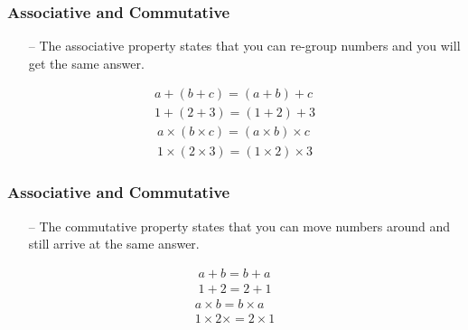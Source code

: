 \begin{frame}[c]{ }
	\frametitle{Associative and Commutative }
	\begin{itemize}  [<+->]
	
	\item [--] The associative property states that you can re-group numbers and you will get the same answer.
	
	
\end{itemize}

\begin{gather*}	
a + (b + c) =  (a + b) + c \\
1 + (2 + 3) = (1 + 2) + 3
\end{gather*}
\begin{gather*}
a \times (b \times c) =  (a \times b) \times c \\
1 \times (2 \times 3) =  (1 \times 2) \times 3
\end{gather*}

\end{frame}
\begin{frame}[c]{ }
	\frametitle{Associative and Commutative }
	\begin{itemize}  [<+->]		
		\item [--] The commutative property states that you can move numbers around and still arrive at the same answer.	
	\end{itemize}


\begin{gather*}	
	a + b =  b + a \\
	1 + 2 = 2 + 1
\end{gather*}
\begin{gather*}
	a \times b =  b \times a \\
	1 \times 2 \times =  2 \times 1
\end{gather*}

\end{frame}
